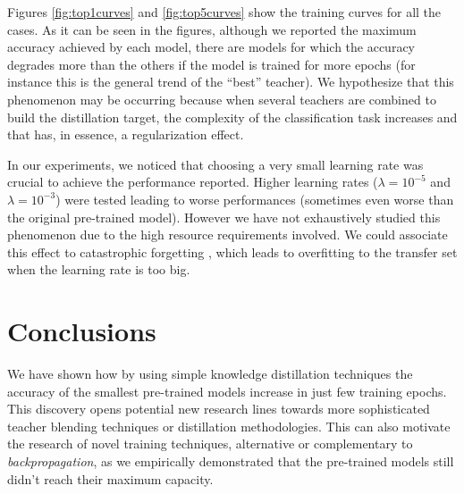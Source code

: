 Figures \ref{fig:top1curves} and \ref{fig:top5curves} show the training curves for all the cases. As it can be seen in the figures, although we reported the maximum accuracy achieved by each model, there are models for which the accuracy degrades more than the others if the model is trained for more epochs (for instance this is the general trend of the ``best'' teacher). We hypothesize that this phenomenon may be occurring because when several teachers are combined to build the distillation target, the complexity of the classification task increases and that has, in essence, a regularization effect.

In our experiments, we noticed that choosing a very small learning rate was crucial to achieve the performance reported. Higher learning rates ($\lambda=10^{-5}$ and  $\lambda=10^{-3}$) were tested leading to worse performances (sometimes even worse than the original pre-trained model). However we have not exhaustively studied this phenomenon due to the high resource requirements involved. We could associate this effect to catastrophic forgetting \autocite{French99}, which leads to overfitting to the transfer set when the learning rate is too big.




\section{Conclusions}  \label{sec:distillation_conclusions}
We have shown how by using simple knowledge distillation techniques the accuracy of the smallest pre-trained models increase in just few training epochs. This discovery opens potential new research lines towards more sophisticated teacher blending techniques or distillation methodologies. This can also motivate the research of novel training techniques, alternative or complementary to \textit{backpropagation}, as we empirically demonstrated that the pre-trained models still didn't reach their maximum capacity.



